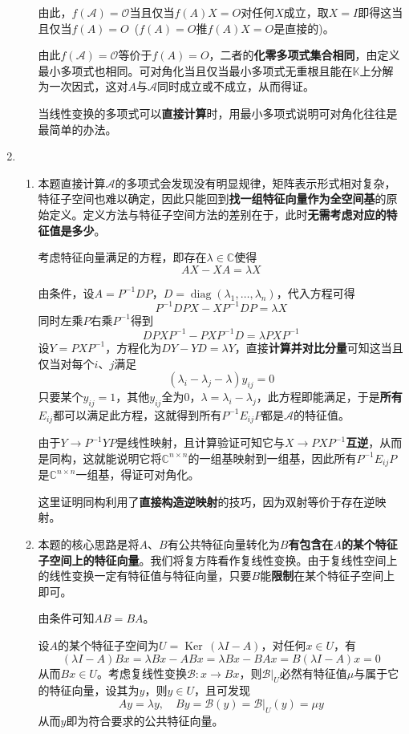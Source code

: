 \documentclass[a4paper,UTF8,fontset=windows,AutoFakeBold]{ctexart}
\DeclareMathOperator{\diag}{diag}
\DeclareMathOperator{\Ker}{Ker\,}
\newcommand*{\ma}{\mathcal{A}}
\newcommand*{\mb}{\mathcal{B}}
\newcommand*{\mo}{\mathcal{O}}
\newcommand*{\note}{\noindent *}
\begin{document}
\begin{enumerate}
\begin{enumerate}
        由此，$f(\ma)=\mo$当且仅当$f(A)X=O$对任何$X$成立，取$X=I$即得这当且仅当$f(A)=O$\ ($f(A)=O$推$f(A)X=O$是直接的)。

        由此$f(\ma)=\mo$等价于$f(A)=O$，二者的\textbf{化零多项式集合相同}，由定义最小多项式也相同。可对角化当且仅当最小多项式无重根且能在$\mathbb{K}$上分解为一次因式，这对$A$与$\ma$同时成立或不成立，从而得证。

        \note 当线性变换的多项式可以\textbf{直接计算}时，用最小多项式说明可对角化往往是最简单的办法。
    \end{enumerate}

    \item
    \begin{enumerate}
        \item
        \note 本题直接计算$\ma$的多项式会发现没有明显规律，矩阵表示形式相对复杂，特征子空间也难以确定，因此只能回到\textbf{找一组特征向量作为全空间基}的原始定义。定义方法与特征子空间方法的差别在于，此时\textbf{无需考虑对应的特征值是多少}。

        考虑特征向量满足的方程，即存在$\lambda\in\mathbb{C}$使得
        $$AX-XA=\lambda X$$

        由条件，设$A=P^{-1}DP$，$D=\diag(\lambda_1,\dots,\lambda_n)$，代入方程可得
        $$P^{-1}DPX-XP^{-1}DP=\lambda X$$
        同时左乘$P$右乘$P^{-1}$得到
        $$DPXP^{-1}-PXP^{-1}D=\lambda PXP^{-1}$$
        设$Y=PXP^{-1}$，方程化为$DY-YD=\lambda Y$，直接\textbf{计算并对比分量}可知这当且仅当对每个$i$、$j$满足
        $$(\lambda_i-\lambda_j-\lambda)y_{ij}=0$$
        只要某个$y_{ij}=1$，其他$y_{ij}$全为0，$\lambda=\lambda_i-\lambda_j$，此方程即能满足，于是\textbf{所有}$E_{ij}$都可以满足此方程，这就得到所有$P^{-1}E_{ij}P$都是$\ma$的特征值。

        由于$Y\to P^{-1}YP$是线性映射，且计算验证可知它与$X\to PXP^{-1}$\textbf{互逆}，从而是同构，这就能说明它将$\mathbb{C}^{n\times n}$的一组基映射到一组基，因此所有$P^{-1}E_{ij}P$是$\mathbb{C}^{n\times n}$一组基，得证可对角化。

        \note 这里证明同构利用了\textbf{直接构造逆映射}的技巧，因为双射等价于存在逆映射。

        \item \note 本题的核心思路是将$A$、$B$有公共特征向量转化为\textbf{$B$有包含在$A$的某个特征子空间上的特征向量}。我们将复方阵看作复线性变换。由于复线性空间上的线性变换一定有特征值与特征向量，只要$B$能\textbf{限制}在某个特征子空间上即可。
        
        由条件可知$AB=BA$。

        设$A$的某个特征子空间为$U=\Ker(\lambda I-A)$，对任何$x\in U$，有
        $$(\lambda I-A)Bx=\lambda Bx-ABx=\lambda Bx-BAx=B(\lambda I-A)x=0$$
        从而$Bx\in U$。考虑复线性变换$\mb:x\to Bx$，则$\mb|_U$必然有特征值$\mu$与属于它的特征向量，设其为$y$，则$y\in U$，且可发现
        $$Ay=\lambda y,\quad By=\mb(y)=\mb|_U(y)=\mu y$$
        从而$y$即为符合要求的公共特征向量。


\end{enumerate}
\end{enumerate}
\end{document}
